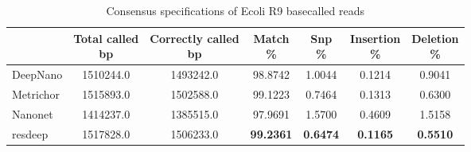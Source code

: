 \documentclass[times, utf8, diplomski, numeric, english]{fer}
\begin{document}
\begin{table}[htb]
	\caption{Consensus specifications of Ecoli R9 basecalled reads}
	\label{tbl:spec_ecoli}
	\centering
	
	\begin{tabular}{lcccccc}
		\toprule
		{} &  \thead{Total called\\\lbrack bp\rbrack} &  \thead{Correctly called\\\lbrack bp\rbrack} &  \thead{Match\\\%} &  \thead{Snp\\\%} &  \thead{Insertion\\\%} &  \thead{Deletion\\\%} \\
		\midrule
		DeepNano  &                  1510244.0 &                      1493242.0 &          98.8742 &         1.0044 &               0.1214 &              0.9041 \\
		Metrichor &                  1515893.0 &                      1502588.0 &          99.1223 &         0.7464 &               0.1313 &              0.6300 \\
		Nanonet   &                  1414237.0 &                      1385515.0 &          97.9691 &         1.5700 &               0.4609 &              1.5158 \\
		resdeep   &                  1517828.0 &                      1506233.0 &          \textbf{99.2361} &         \textbf{0.6474} &               \textbf{0.1165} &             \textbf{ 0.5510 }\\
		\bottomrule
	\end{tabular}
	
\end{table}
\end{document}
